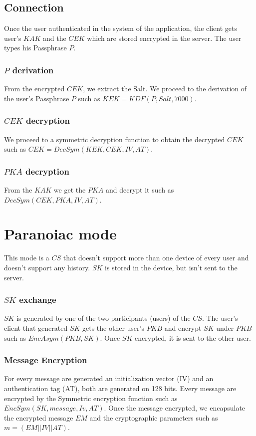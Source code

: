 \documentclass[a4paper,10pt]{article}
\begin{document}
\subsection{Connection}
Once the user authenticated in the system of the application, the client gets user's $KAK$ and the $CEK$ which are stored encrypted in the server. The user types his Passphrase $P$.
\subsubsection{$P$ derivation}
From the encrypted $CEK$, we extract the Salt. We proceed to the derivation of the user's Passphrase $P$ such as $KEK=KDF(P, Salt, 7000)$.
\subsubsection{$CEK$ decryption}
We proceed to a symmetric decryption function to obtain the decrypted $CEK$ such as $CEK=DecSym(KEK, CEK, IV,AT)$.
\subsubsection{$PKA$ decryption}
From the $KAK$ we get the $PKA$ and decrypt it such as $DecSym(CEK, PKA, IV, AT)$.

\section{Paranoiac mode}
This mode is a $CS$ that doesn't support more than one device of every user and doesn't support any history. $SK$ is stored in the device, but isn't sent to the server.
\subsubsection{$SK$ exchange}
$SK$ is generated by one of the two participants (users) of the $CS$. The user's client that generated $SK$ gets the other user's $PKB$ and encrypt $SK$ under $PKB$ such as $EncAsym(PKB, SK)$. Once $SK$ encrypted, it is sent to the other user.
\subsubsection{Message Encryption}
For every message are generated an initialization vector (IV) and an authentication tag (AT), both are generated on 128 bits. Every message are encrypted by the Symmetric encryption function such as $EncSym(SK,message,Iv, AT)$. Once the message encrypted, we encapsulate the encrypted message $EM$ and the cryptographic parameters such as $m=(EM||IV||AT)$.
\end{document}

